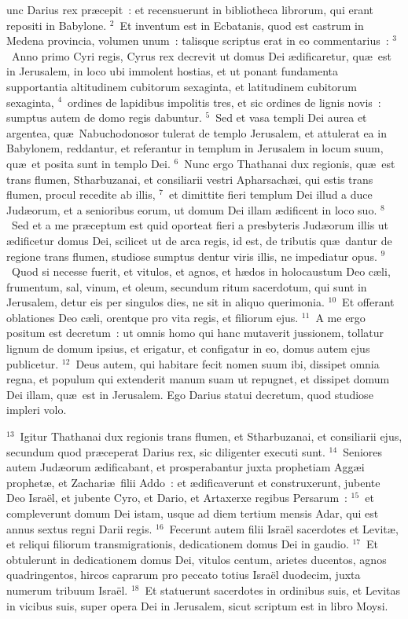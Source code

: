 \bchapter
{}unc Darius rex pr\ae cepit~: et recensuerunt in bibliotheca librorum, qui erant repositi in Babylone.
${}^{2}$~Et inventum est in Ecbatanis, quod est castrum in Medena provincia, volumen unum~: talisque scriptus erat in eo commentarius~:
${}^{3}$~Anno primo Cyri regis, Cyrus rex decrevit ut domus Dei \ae dificaretur, qu\ae\ est in Jerusalem, in loco ubi immolent hostias, et ut ponant fundamenta supportantia altitudinem cubitorum sexaginta, et latitudinem cubitorum sexaginta,
${}^{4}$~ordines de lapidibus impolitis tres, et sic ordines de lignis novis~: sumptus autem de domo regis dabuntur.
${}^{5}$~Sed et vasa templi Dei aurea et argentea, qu\ae\ Nabuchodonosor tulerat de templo Jerusalem, et attulerat ea in Babylonem, reddantur, et referantur in templum in Jerusalem in locum suum, qu\ae\ et posita sunt in templo Dei.
${}^{6}$~Nunc ergo Thathanai dux regionis, qu\ae\ est trans flumen, Stharbuzanai, et consiliarii vestri Apharsach\ae i, qui estis trans flumen, procul recedite ab illis,
${}^{7}$~et dimittite fieri templum Dei illud a duce Jud\ae orum, et a senioribus eorum, ut domum Dei illam \ae dificent in loco suo.
${}^{8}$~Sed et a me pr\ae ceptum est quid oporteat fieri a presbyteris Jud\ae orum illis ut \ae dificetur domus Dei, scilicet ut de arca regis, id est, de tributis qu\ae\ dantur de regione trans flumen, studiose sumptus dentur viris illis, ne impediatur opus.
${}^{9}$~Quod si necesse fuerit, et vitulos, et agnos, et h\ae dos in holocaustum Deo c\ae li, frumentum, sal, vinum, et oleum, secundum ritum sacerdotum, qui sunt in Jerusalem, detur eis per singulos dies, ne sit in aliquo querimonia.
${}^{10}$~Et offerant oblationes Deo c\ae li, orentque pro vita regis, et filiorum ejus.
${}^{11}$~A me ergo positum est decretum~: ut omnis homo qui hanc mutaverit jussionem, tollatur lignum de domum ipsius, et erigatur, et configatur in eo, domus autem ejus publicetur.
${}^{12}$~Deus autem, qui habitare fecit nomen suum ibi, dissipet omnia regna, et populum qui extenderit manum suam ut repugnet, et dissipet domum Dei illam, qu\ae\ est in Jerusalem. Ego Darius statui decretum, quod studiose impleri volo.


${}^{13}$~Igitur Thathanai dux regionis trans flumen, et Stharbuzanai, et consiliarii ejus, secundum quod pr\ae ceperat Darius rex, sic diligenter executi sunt.
${}^{14}$~Seniores autem Jud\ae orum \ae dificabant, et prosperabantur juxta prophetiam Agg\ae i prophet\ae , et Zachari\ae\ filii Addo~: et \ae dificaverunt et construxerunt, jubente Deo Isra\"el, et jubente Cyro, et Dario, et Artaxerxe regibus Persarum~:
${}^{15}$~et compleverunt domum Dei istam, usque ad diem tertium mensis Adar, qui est annus sextus regni Darii regis.
${}^{16}$~Fecerunt autem filii Isra\"el sacerdotes et Levit\ae , et reliqui filiorum transmigrationis, dedicationem domus Dei in gaudio.
${}^{17}$~Et obtulerunt in dedicationem domus Dei, vitulos centum, arietes ducentos, agnos quadringentos, hircos caprarum pro peccato totius Isra\"el duodecim, juxta numerum tribuum Isra\"el.
${}^{18}$~Et statuerunt sacerdotes in ordinibus suis, et Levitas in vicibus suis, super opera Dei in Jerusalem, sicut scriptum est in libro Moysi.


